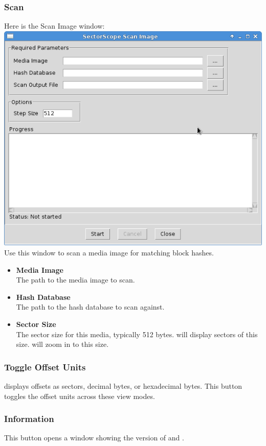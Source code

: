 \documentclass[11pt,fleqn]{article} %
\begin{document}
\subsubsection{Scan}
Here is the \sscope Scan Image window:\\
\includegraphics[scale=.4]{screenshots/scan}\\
Use this window to scan a media image for matching block hashes.
\begin{itemize}
\item \textbf{Media Image}\\
The path to the media image to scan.
\item \textbf{Hash Database}\\
The path to the hash database to scan against.
\item \textbf{Sector Size}\\
The sector size for this media, typically 512 bytes. \sscope will display sectors of this size. \sscope will zoom in to this size.
\end{itemize}

\subsubsection{Toggle Offset Units}
\sscope displays offsets as sectors, decimal bytes, or hexadecimal bytes. This button toggles the offset units across these view modes.

\subsubsection{Information}
This button opens a window showing the version of \sscope and \hdb.
\end{document}
